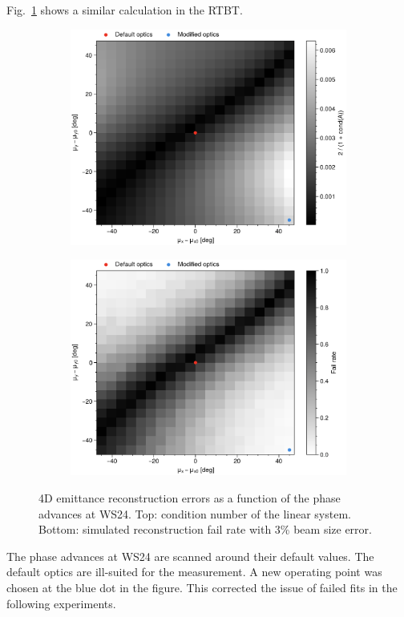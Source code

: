 Fig.~\ref{fig:rtbt_condition_number} shows a similar calculation in the RTBT. 
%
\begin{figure}[!p]
    \centering
    \begin{subfigure}{0.75\textwidth}
        \includegraphics[width=1.0\textwidth]{Images/chapter4/rtbt_condition_number.png}
    \end{subfigure}
    \vfill
    \vspace*{0.8cm}
    \begin{subfigure}{0.75\textwidth}
        \includegraphics[width=1.0\textwidth]{Images/chapter4/rtbt_fail_rate.png}
    \end{subfigure}
    \caption{4D emittance reconstruction errors as a function of the phase advances at WS24. Top: condition number of the linear system. Bottom: simulated reconstruction fail rate with 3\% beam size error.}
    \label{fig:rtbt_condition_number}
\end{figure}
%
The phase advances at WS24 are scanned around their default values. The default optics are ill-suited for the measurement. A new operating point was chosen at the blue dot in the figure. This corrected the issue of failed fits in the following experiments. 

